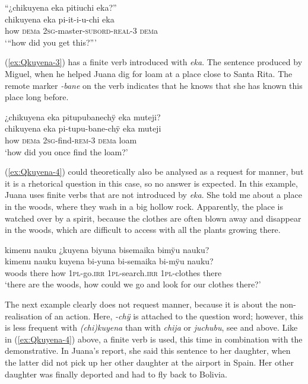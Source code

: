\ea\label{ex:Qkuyena-3}
\begingl
\glpreamble “¿chikuyena eka pitiuchi eka?” \\
\gla chikuyena eka pi-it-i-u-chi eka\\
\glb how \textsc{dem}a 2\textsc{sg}-master-\textsc{subord}-\textsc{real}-3 \textsc{dem}a\\
\glft ‘“how did you get this?”’
\endgl
\trailingcitation{[jmx-n120429ls-x5.245-246]}
\xe

(\ref{ex:Qkuyena-3}) has a finite verb introduced with \textit{eka}. The sentence produced by Miguel, when he helped Juana dig for loam at a place close to Santa Rita. The remote marker \textit{-bane} on the verb indicates that he knows that she has known this place long before.

\ea\label{ex:Qkuyena-2}
\begingl
\glpreamble ¿chikuyena eka pitupubanechÿ eka muteji? \\
\gla chikuyena eka pi-tupu-bane-chÿ eka muteji\\
\glb how \textsc{dem}a 2\textsc{sg}-find-\textsc{rem}-3 \textsc{dem}a loam\\
\glft ‘how did you once find the loam?’
\endgl
\trailingcitation{[jmx-d110918ls-1.013]}
\xe

(\ref{ex:Qkuyena-4}) could theoretically also be analysed as a request for manner, but it is a rhetorical question in this case, so no answer is expected. In this example, Juana uses finite verbs that are not introduced by \textit{eka}. She told me about a place in the woods, where they wash in a big hollow rock. Apparently, the place is watched over by a spirit, because the clothes are often blown away and disappear in the woods, which are difficult to access with all the plants growing there.

\ea\label{ex:Qkuyena-4}
\begingl
\glpreamble kimenu nauku ¿kuyena biyuna bisemaika bimÿu nauku?\\
\gla kimenu nauku kuyena bi-yuna bi-semaika bi-mÿu nauku?\\
\glb woods there how 1\textsc{pl}-go.\textsc{irr} 1\textsc{pl}-search.\textsc{irr} 1\textsc{pl}-clothes there\\
\glft ‘there are the woods, how could we go and look for our clothes there?’
\endgl
\trailingcitation{[jxx-p151020l-2]}
\xe

The next example clearly does not request manner, because it is about the non-realisation of an action. Here, \textit{-chÿ} is attached to the question word; however, this is less frequent with \textit{(chi)kuyena} than with \textit{chija} or \textit{juchubu}, see  and  above. Like in (\ref{ex:Qkuyena-4}) above, a finite verb is used, this time in combination with the demonstrative. In Juana’s report, she said this sentence to her daughter, when the latter did not pick up her other daughter at the airport in Spain. Her other daughter was finally deported and had to fly back to Bolivia.


